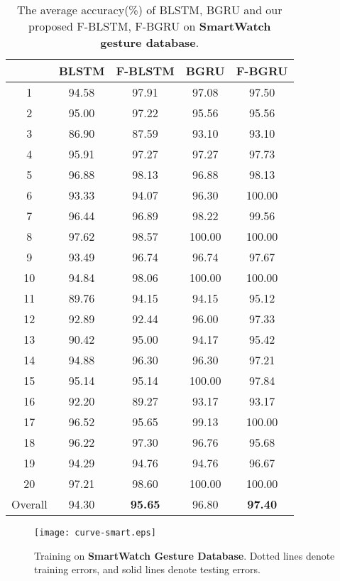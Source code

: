 \documentclass[review]{elsarticle}
\begin{document}
\begin{table*}
	\centering
	\caption{The average accuracy(\%) of BLSTM, BGRU and our proposed F-BLSTM, F-BGRU on \textbf{SmartWatch gesture database}.}
	\label{table:smartwatch-database}
	\vspace*{6pt}
	\begin{tabular}{||c||c|c||c|c||}
		\hline
		\diagbox{\textbf{Gesture}}{\textbf{Method}} & BLSTM & F-BLSTM & BGRU & F-BGRU\\
		\hline
		1  & 94.58  & 97.91 & 97.08  & 97.50 \\ 2  & 95.00  & 97.22 & 95.56  & 95.56 \\ 3  & 86.90  & 87.59 & 93.10  & 93.10 \\ 4  & 95.91  & 97.27 & 97.27  & 97.73 \\ 5  & 96.88  & 98.13 & 96.88  & 98.13 \\ 6  & 93.33  & 94.07 & 96.30  & 100.00 \\ 7  & 96.44  & 96.89 & 98.22  & 99.56 \\ 8  & 97.62  & 98.57 & 100.00  & 100.00 \\ 9  & 93.49  & 96.74 & 96.74  & 97.67 \\ 10 & 94.84  & 98.06 & 100.00  & 100.00 \\ 11 & 89.76  & 94.15 & 94.15  & 95.12 \\ 12 & 92.89  & 92.44 & 96.00  & 97.33 \\ 13 & 90.42  & 95.00 & 94.17  & 95.42 \\ 14 & 94.88  & 96.30 & 96.30  & 97.21 \\ 15 & 95.14  & 95.14 & 100.00  & 97.84 \\ 16 & 92.20  & 89.27 & 93.17  & 93.17 \\ 17 & 96.52  & 95.65 & 99.13  & 100.00 \\ 18 & 96.22  & 97.30 & 96.76  & 95.68 \\ 19 & 94.29  & 94.76 & 94.76  & 96.67 \\ 20 & 97.21  & 98.60 & 100.00  & 100.00 \\ \hline
		Overall & 94.30 & \textbf{95.65} & 96.80 & \textbf{97.40} \\ \hline
	\end{tabular}
\end{table*}

\begin{figure*}[htbp]
	\normalsize
	\centering
	\texttt{[image: curve-smart.eps]}
	\caption{Training on \textbf{SmartWatch Gesture Database}. Dotted lines denote training errors, and solid lines denote testing errors. }
	\label{fig:curve-smart}
	\vspace*{4pt}
\end{figure*}
\end{document}
